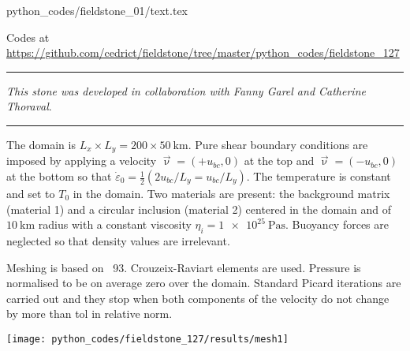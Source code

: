 \begin{flushright} {\tiny {\color{gray} python\_codes/fieldstone\_01/text.tex}} \end{flushright}



\begin{center}

Codes at \url{https://github.com/cedrict/fieldstone/tree/master/python_codes/fieldstone_127}
\end{center}

\par\noindent\rule{\textwidth}{0.4pt}

{\sl This stone was developed in collaboration with Fanny Garel and Catherine Thoraval}. 

\par\noindent\rule{\textwidth}{0.4pt}


The domain is $L_x \times L_y=200\times 50~\si{\km}$. Pure shear boundary conditions are imposed by 
applying a velocity $\vec\upnu=(+u_{bc},0)$ at the top and $\vec\upnu=(-u_{bc},0)$ at the bottom so 
that $\dot\varepsilon_{0}=\frac12 (2u_{bc}/L_y=u_{bc}/L_y)$.
The temperature is constant and set to $T_0$ in the domain.
Two materials are present: the background matrix (material 1) and a circular inclusion (material 2)
centered in the domain and of $10~\si{\km}$ radius with a constant 
viscosity $\eta_i=\SI{1e25}{\pascal\second}$.
Buoyancy forces are neglected so that density values are irrelevant.

Meshing is based on \stone~93. Crouzeix-Raviart elements are used. Pressure is normalised to be
on average zero over the domain.
Standard Picard iterations are carried out and they stop when both components 
of the velocity do not change by more than {\python tol} in relative norm. 

\begin{center}
\texttt{[image: python\_codes/fieldstone\_127/results/mesh1]}
\end{center}

